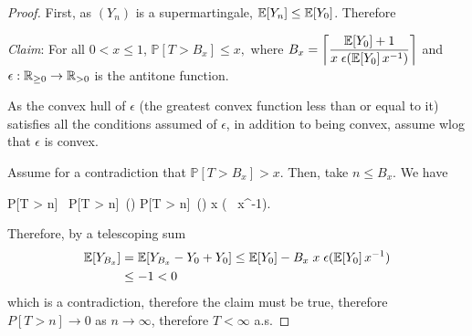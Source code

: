 \label{apx:antitone}
\ACStrict*
\begin{proof}
First, as $(Y_n)$ is a supermartingale, $\mathbb{E}[Y_n] \leq \mathbb{E}[Y_0]$. 
Therefore
\begin{calculation}
\end{calculation}

\emph{Claim}: For all $0 < x \leq 1$, 
\(
\mathbb P[T > B_x] \leq x,
\)
where $B_x = \left \lceil \dfrac{\mathbb{E}[Y_0]+1}{x \; \epsilon(\mathbb{E}[Y_0] \, x^{-1})} \right \rceil$ and $\epsilon : \mathbb{R}_{{\geq}0} \to \mathbb{R}_{{>}0}$ is the antitone function. 

\smallskip

As the convex hull of $\epsilon$ (the greatest convex function less than or equal to it) satisfies all the conditions assumed of $\epsilon$, in addition to being convex, assume wlog that $\epsilon$ is convex.

Assume for a contradiction that $\mathbb P[T > B_x] > x$.
Then, take $n \leq B_x$. 
We have
\begin{calculation}
\mathbb P[T > n]\ 
\mathbb P[T > n]\ \epsilon()
\mathbb P[T > n]\ \epsilon\Big(\Big)
x \; \epsilon\big( \, x^{-1}\big).
\end{calculation}
Therefore, by a telescoping sum
\begin{align*}
\mathbb{E}[Y_{B_x}] 
&= \mathbb{E}[Y_{B_x}-Y_0+Y_0] \leq \mathbb{E}[Y_0] - B_x \; x \; \epsilon(\mathbb{E}[Y_0] \, x^{-1})\\
&\leq -1 < 0 
\end{align*}
which is a contradiction, therefore the claim must be true, therefore $P[T > n] \to 0$ as $n \to \infty$, therefore $T < \infty$ a.s.
\end{proof}

